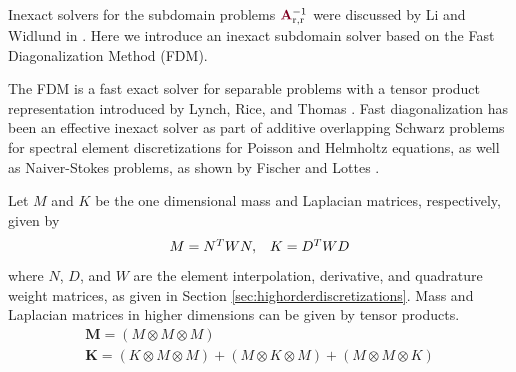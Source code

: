 Inexact solvers for the subdomain problems ${\color{burgundy}\mathbf{A}}_{\text{r}, \text{r}}^{-1}$ were discussed by Li and Widlund in \cite{li2007use}.
Here we introduce an inexact subdomain solver based on the Fast Diagonalization Method (FDM).

The FDM is a fast exact solver for separable problems with a tensor product representation introduced by Lynch, Rice, and Thomas \cite{lynch1964direct}.
Fast diagonalization has been an effective inexact solver as part of additive overlapping Schwarz problems for spectral element discretizations for Poisson and Helmholtz equations, as well as Naiver-Stokes problems, as shown by Fischer and Lottes \cite{fischer2005hybrid}.

Let $M$ and $K$ be the one dimensional mass and Laplacian matrices, respectively, given by
\begin{equation}
\begin{array}{c c}
M = N^T W N,  &  K = D^T W D
\end{array}
\end{equation}
where $N$, $D$, and $W$ are the element interpolation, derivative, and quadrature weight matrices, as given in Section \ref{sec:highorderdiscretizations}.
Mass and Laplacian matrices in higher dimensions can be given by tensor products.
\begin{equation}
\begin{array}{c}
\mathbf{M} = \left( M \otimes M \otimes M \right)  \\
\mathbf{K} = \left( K \otimes M \otimes M \right) + \left( M \otimes K \otimes M \right) + \left( M \otimes M \otimes K \right)  \\
\end{array}
\end{equation}

